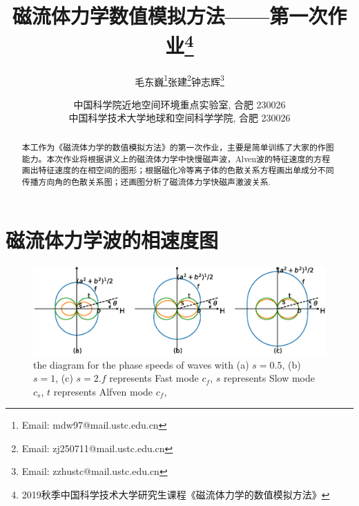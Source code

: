 \documentclass[landscape]{article}
\begin{document}
	
	\renewcommand{\refname}{参考文献}
	\renewcommand{\figurename}{图}
	\renewcommand{\abstractname}{摘要}
	\def\due{2019年9月25日周三0:00}
	
	\title{磁流体力学数值模拟方法——第一次作业\footnote{2019秋季中国科学技术大学研究生课程《磁流体力学的数值模拟方法》}}
	
	
	\author{毛东巍\footnote{Email: mdw97@mail.ustc.edu.cn}\quad 张建\footnote{Email: zj250711@mail.ustc.edu.cn}\quad 钟志辉\footnote{Email: zzhustc@mail.ustc.edu.cn}}
	
	\date{%
		\scriptsize%
		中国科学院近地空间环境重点实验室, 合肥 230026\\
		中国科学技术大学地球和空间科学学院, 合肥 230026
	}
	
	\maketitle
	
	\begin{abstract}
		本工作为《磁流体力学的数值模拟方法》的第一次作业，主要是简单训练了大家的作图能力。本次作业将根据讲义上的磁流体力学中快慢磁声波，Alven波的特征速度的方程画出特征速度的在相空间的图形；根据磁化冷等离子体的色散关系方程画出单成分不同传播方向角的色散关系图；还画图分析了磁流体力学快磁声激波关系.
	\end{abstract}
	
	\section{磁流体力学波的相速度图}

    \begin{figure}[htb]
		\centering
		\includegraphics[width=\textwidth]{figure1.eps}
		\caption{the diagram for the phase speeds of waves with (a) $s = 0.5$, (b) $s=1$, (c) $s=2$.$f$ represents Fast mode $c_f$, $s$ represents Slow mode $c_s$, $t$ represents Alfven mode $c_f$,}\label{Friedrich}
	\end{figure}
	
\end{document}
